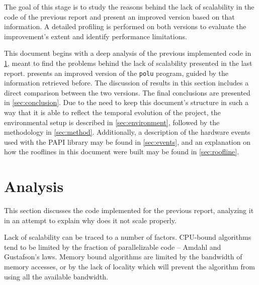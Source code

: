 \documentclass[abstract=on,9pt,twocolumn]{scrartcl}
\begin{document}
The goal of this stage is to study the reasons behind the lack of scalability in the code of the previous report and present an improved version based on that information. A detailed profiling is performed on both versions to evaluate the improvement's extent and identify performance limitations.

This document begins with a deep analysis of the previous implemented code in \cref{sec:aos}, meant to find the problems behind the lack of scalability presented in the last report.  presents an improved version of the \texttt{polu} program, guided by the information retrieved before. The discussion of results in this section includes a direct comparison between the two versions. The final conclusions are presented in \cref{sec:conclusion}. Due to the need to keep this document's structure in such a way that it is able to reflect the temporal evolution of the project, the environmental setup is described in \cref{sec:environment}, followed by the methodology in \cref{sec:method}. Additionally, a description of the hardware events used with the PAPI library may be found in \cref{sec:events}, and an explanation on how the rooflines in this document were built may be found in \cref{sec:roofline}.









\section{Analysis}
\label{sec:aos}
This section discusses the code implemented for the previous report, analyzing it in an attempt to explain why does it not scale properly.

Lack of scalability can be traced to a number of factors. CPU-bound algorithms tend to be limited by the fraction of parallelizable code -- Amdahl and Gustafson's laws. Memory bound  algorithms are limited by the bandwidth of memory accesses, or by the lack of locality which will prevent the algorithm from using all the available bandwidth.
\end{document}
